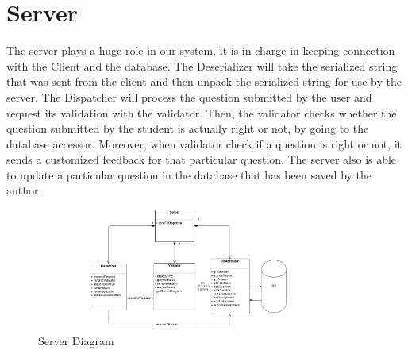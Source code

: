     \chapter{Server}
    The server plays a huge role in our system, it is in charge in keeping connection with the Client and the database. The Deserializer will take the serialized string that was sent from the client and then unpack the serialized string for use by the server.  The Dispatcher will process the question submitted by the user and request its validation with the validator. Then, the validator checks whether the question submitted by the student is actually right or not, by going to the database accessor. Moreover, when validator check if a question is right or not, it sends a customized feedback for that particular question.
The server also is able to update a particular question in the database that has been saved by the author. 

                        \begin{figure}[H]
            \centerline{\includegraphics[height=4cm, width=10cm]{Server.jpg}}
            \caption{Server Diagram}
    \end{figure}
    